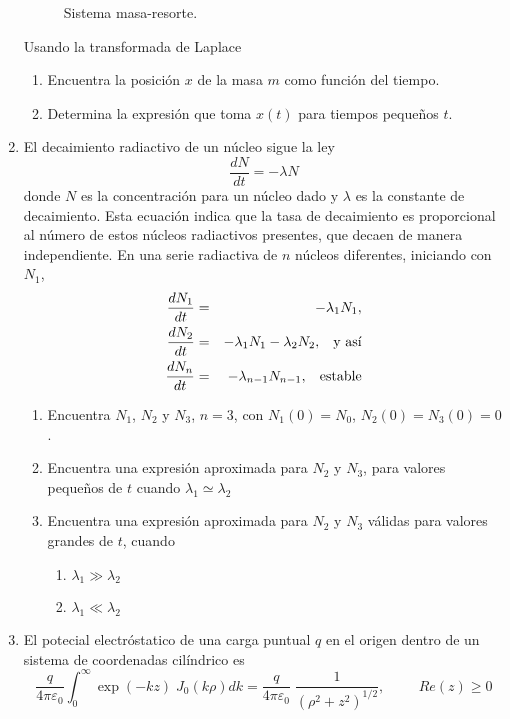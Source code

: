 \begin{enumerate}
\begin{figure}[H]

\caption{Sistema masa-resorte.}
\label{fig:figura1}
\end{figure}
Usando la transformada de Laplace
\begin{enumerate}[label=\alph*)]
\item Encuentra la posición $x$ de la masa $m$ como función del tiempo.
\item Determina la expresión que toma $x(t)$ para tiempos pequeños $t$.
\end{enumerate}
\item El decaimiento radiactivo de un núcleo sigue la ley
\[ \dfrac{d N}{d t} = - \lambda N \]
donde $N$ es la concentración para un núcleo dado y $\lambda$ es la constante de decaimiento. Esta ecuación indica que la tasa de decaimiento es proporcional al número de estos núcleos radiactivos presentes, que decaen de manera independiente. En una serie radiactiva de $n$ núcleos diferentes, iniciando con $N_{1}$,
\begin{eqnarray*}
\dfrac{d N_{1}}{dt} &=& - \lambda_{1} N_{1}, \nonumber \\
\dfrac{d N_{2}}{dt} &=& - \lambda_{1} N_{1} - \lambda_{2} N_{2}, \hspace{0.3cm} \mbox{y así} \nonumber \\
\dfrac{d N_{n}}{dt} &=& - \lambda_{n-1} N_{n-1}, \hspace{0.3cm} \mbox{estable} \nonumber
\end{eqnarray*} 
\begin{enumerate}[label=\alph*)]
\item Encuentra $N_{1}$, $N_{2}$ y $N_{3}$, $n=3$, con $N_{1}(0)=N_{0}$, $N_{2}(0)=N_{3}(0) =0$.
\item Encuentra una expresión aproximada para $N_{2}$ y $N_{3}$, para valores pequeños de $t$ cuando $\lambda_{1} \simeq \lambda_{2}$
\item Encuentra una expresión aproximada para $N_{2}$ y $N_{3}$ válidas para valores grandes de $t$, cuando
\begin{enumerate}[label=\roman*)]
\item $\lambda_{1} \gg \lambda_{2}$
\item $\lambda_{1} \ll \lambda_{2}$
\end{enumerate}
\end{enumerate}
\item El potecial electróstatico de una carga puntual $q$ en el origen dentro de un sistema de coordenadas cilíndrico es
\[ \dfrac{q}{4 \pi \varepsilon_{0}} \int_{0}^{\infty} \exp(-kz) \; J_{0}(k \rho) dk = \dfrac{q}{4 \pi \varepsilon_{0}}  \;\dfrac{1}{(\rho^{2} + z^{2})^{1/2}}, \hspace{1cm} Re(z) \geq 0\]

\end{enumerate}
